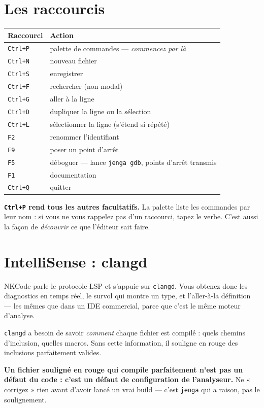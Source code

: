 \section{Les raccourcis}

\begin{center}
\begin{tabular}{@{}ll@{}}
\toprule
\textbf{Raccourci} & \textbf{Action} \\
\midrule
\texttt{Ctrl+P} & palette de commandes --- \emph{commencez par là} \\
\texttt{Ctrl+N} & nouveau fichier \\
\texttt{Ctrl+S} & enregistrer \\
\texttt{Ctrl+F} & rechercher (non modal) \\
\texttt{Ctrl+G} & aller à la ligne \\
\texttt{Ctrl+D} & dupliquer la ligne ou la sélection \\
\texttt{Ctrl+L} & sélectionner la ligne (s'étend si répété) \\
\texttt{F2} & renommer l'identifiant \\
\texttt{F9} & poser un point d'arrêt \\
\texttt{F5} & déboguer --- lance \texttt{jenga gdb}, points d'arrêt transmis \\
\texttt{F1} & documentation \\
\texttt{Ctrl+Q} & quitter \\
\bottomrule
\end{tabular}
\end{center}

\begin{nkretenir}
\textbf{\texttt{Ctrl+P} rend tous les autres facultatifs.} La palette liste les
commandes par leur nom : si vous ne vous rappelez pas d'un raccourci, tapez le
verbe. C'est aussi la façon de \emph{découvrir} ce que l'éditeur sait faire.
\end{nkretenir}

\section{IntelliSense : clangd}

NKCode parle le protocole LSP et s'appuie sur \texttt{clangd}. Vous obtenez donc
les diagnostics en temps réel, le survol qui montre un type, et l'aller-à-la
définition --- les mêmes que dans un IDE commercial, parce que c'est le même
moteur d'analyse.

\begin{nkpiege}
\texttt{clangd} a besoin de savoir \emph{comment} chaque fichier est compilé :
quels chemins d'inclusion, quelles macros. Sans cette information, il souligne en
rouge des inclusions parfaitement valides.

\textbf{Un fichier souligné en rouge qui compile parfaitement n'est pas un défaut
du code : c'est un défaut de configuration de l'analyseur.} Ne « corrigez » rien
avant d'avoir lancé un vrai build --- c'est \texttt{jenga} qui a raison, pas le
soulignement.
\end{nkpiege}

